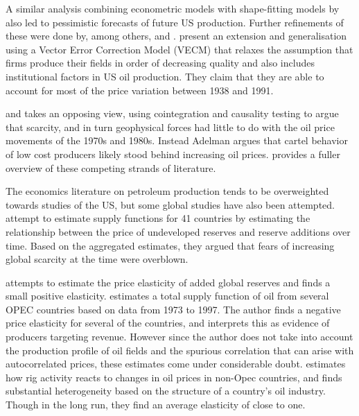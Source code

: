 \documentclass[12pt]{article}
\begin{document}
A similar analysis combining econometric models with shape-fitting models by \citet{cleveland_forecasting_1991} also led to pessimistic forecasts of future US production. Further refinements of these were done by, among others, \citet{pesaran_forecasting_1995}  and \citet{moroney_integrated_1999}. \citet{kaufmann_oil_2001} present an extension and generalisation using a Vector Error Correction Model (VECM) that relaxes the assumption that firms produce their fields in order of decreasing quality and also includes institutional factors in US oil production. They claim that they are able to account for most of the price variation between 1938 and 1991.

\citet{adelman_mineral_1990} and \citet{adelman_modelling_1993} takes an opposing view, using cointegration and causality testing to argue that scarcity, and in turn geophysical forces had little to do with the oil price movements of the 1970s and 1980s. Instead Adelman argues that cartel behavior of low cost producers likely stood behind increasing oil prices. \citet{lynch_forecasting_2002} provides a fuller overview of these competing strands of literature. 

The economics literature on petroleum production tends to be overweighted towards studies of the US, but some global studies have also been attempted. \citet{watkins_world_1998} attempt to estimate supply functions for 41 countries by estimating the relationship between the price of undeveloped reserves and reserve additions over time. Based on the aggregated estimates, they argued that fears of increasing global scarcity at the time were overblown. 

\citet{farzin_impact_2001} attempts to estimate the price elasticity of added global reserves and finds a small positive elasticity.  \citet{ramcharran_oil_2002} estimates a total supply function of oil from several OPEC countries based on data from 1973 to 1997.  The author finds a negative price elasticity for several of the countries, and interprets this as evidence of producers targeting revenue.  However since the author does not take into account the production profile of oil fields and the spurious correlation that can arise with autocorrelated prices, these estimates come under considerable doubt. \citet{ringlund_does_2008} estimates how rig activity reacts to changes in oil prices in non-Opec countries, and finds substantial heterogeneity based on the structure of a country's oil industry. Though in the long run, they find an average elasticity of close to one. 
\end{document}
